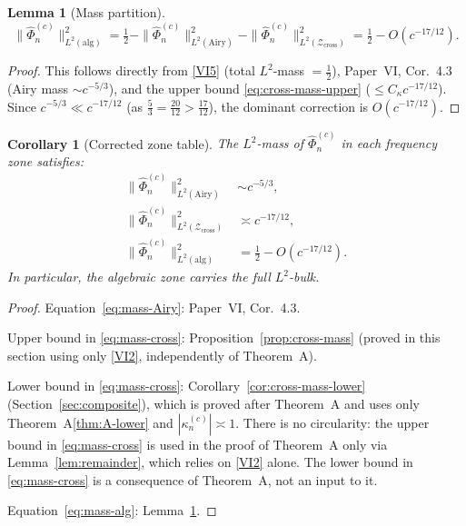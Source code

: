 \documentclass[12pt,a4paper]{amsart}
\newtheorem{lemma}[theorem]{Lemma}
\newtheorem{corollary}[theorem]{Corollary}
\theoremstyle{definition}
\theoremstyle{remark}
\newcommand{\Zcross}{\mathcal{Z}_{\mathrm{cross}}}
\begin{document}
\begin{lemma}[Mass partition]
\label{lem:mass-partition}
\begin{equation}
\label{eq:mass-partition}
\|\widehat{\Phi}_n^{(c)}\|_{L^2(\mathrm{alg})}^2
= \tfrac{1}{2}
- \|\widehat{\Phi}_n^{(c)}\|_{L^2(\mathrm{Airy})}^2
- \|\widehat{\Phi}_n^{(c)}\|_{L^2(\Zcross)}^2
= \tfrac{1}{2} - O(c^{-17/12}).
\end{equation}
\end{lemma}

\begin{proof}
This follows directly from \eqref{VI5}
(total $L^2$-mass $= \tfrac{1}{2}$),
Paper~VI, Cor.~4.3 (Airy mass $\sim c^{-5/3}$),
and the upper bound \eqref{eq:cross-mass-upper}
($\le C_\kappa c^{-17/12}$).
Since $c^{-5/3} \ll c^{-17/12}$
(as $\tfrac{5}{3} = \tfrac{20}{12} > \tfrac{17}{12}$),
the dominant correction is $O(c^{-17/12})$.
\end{proof}

\begin{corollary}[Corrected zone table]
\label{cor:zone-table}
The $L^2$-mass of $\widehat{\Phi}_n^{(c)}$
in each frequency zone satisfies:
\begin{align}
\label{eq:mass-Airy}
\|\widehat{\Phi}_n^{(c)}\|_{L^2(\mathrm{Airy})}^2
&\sim c^{-5/3}, \\
\label{eq:mass-cross}
\|\widehat{\Phi}_n^{(c)}\|_{L^2(\Zcross)}^2
&\asymp c^{-17/12}, \\
\label{eq:mass-alg}
\|\widehat{\Phi}_n^{(c)}\|_{L^2(\mathrm{alg})}^2
&= \tfrac{1}{2} - O(c^{-17/12}).
\end{align}
In particular, the algebraic zone carries
the full $L^2$-bulk.
\end{corollary}

\begin{proof}
Equation~\eqref{eq:mass-Airy}: Paper~VI, Cor.~4.3.

Upper bound in \eqref{eq:mass-cross}:
Proposition~\ref{prop:cross-mass}
(proved in this section using only \eqref{VI2},
independently of Theorem~A).

Lower bound in \eqref{eq:mass-cross}:
Corollary~\ref{cor:cross-mass-lower}
(Section~\ref{sec:composite}), which is proved
after Theorem~A and uses only
Theorem~A\eqref{thm:A-lower} and $|\kappa_n^{(c)}| \asymp 1$.
There is no circularity: the upper bound in
\eqref{eq:mass-cross} is used in the proof of
Theorem~A only via Lemma~\ref{lem:remainder},
which relies on \eqref{VI2} alone.
The lower bound in \eqref{eq:mass-cross}
is a consequence of Theorem~A, not an input to it.

Equation~\eqref{eq:mass-alg}:
Lemma~\ref{lem:mass-partition}.
\end{proof}
\end{document}
